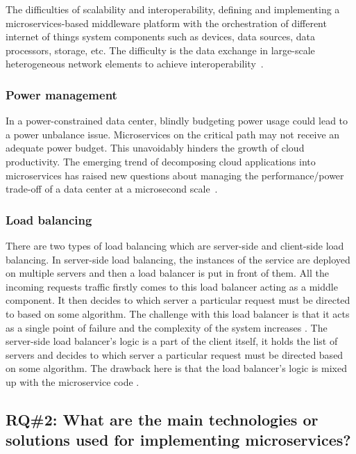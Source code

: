\par The difficulties of scalability and interoperability, defining and implementing a microservices-based middleware platform with the orchestration of different internet of things system components such as devices, data sources, data processors, storage, etc. The difficulty is the data exchange in large-scale heterogeneous network elements to achieve interoperability~\cite{Fred2015}.

\subsubsection{Power management}%

In a power-constrained data center, blindly budgeting power usage could lead to a power unbalance issue. Microservices on the critical path may not receive an adequate power budget. This unavoidably hinders the growth of cloud productivity. The emerging trend of decomposing cloud applications into microservices has raised new questions about managing the performance/power trade-off of a data center at a microsecond scale~\cite{Hou2020}.

\subsubsection{Load balancing}%

There are two types of load balancing which are server-side and client-side load balancing. In server-side load balancing, the instances of the service are deployed on multiple servers and then a load balancer is put in front of them. All the incoming requests traffic firstly comes to this load balancer acting as a middle component. It then decides to which server a particular request must be directed to based on some algorithm. The challenge with this load balancer is that it acts as a single point of failure and the complexity of the system increases \cite{Ville2019}. The server-side load balancer's logic is a part of the client itself, it holds the list of servers and decides to which server a particular request must be directed based on some algorithm. The drawback here is that the load balancer's logic is mixed up with the microservice code \cite{Branko2018}.


\subsection{RQ\#2: What are the main technologies or solutions used for implementing microservices?}\label{sec:results-rq2}

